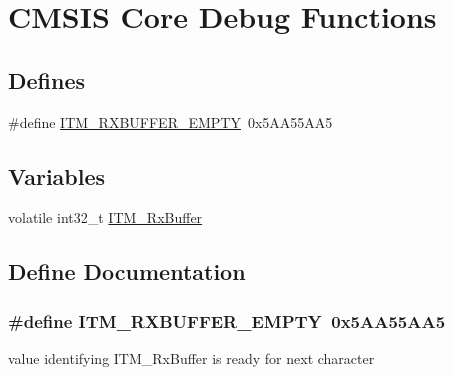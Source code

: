 \hypertarget{group___c_m_s_i_s__core___debug_functions}{\section{\-C\-M\-S\-I\-S \-Core \-Debug \-Functions}
\label{group___c_m_s_i_s__core___debug_functions}
}
\subsection*{\-Defines}
\begin{DoxyCompactItemize}
\item 
\#define \hyperlink{group___c_m_s_i_s__core___debug_functions_gaa822cb398ee022b59e9e6c5d7bbb228a}{\-I\-T\-M\-\_\-\-R\-X\-B\-U\-F\-F\-E\-R\-\_\-\-E\-M\-P\-T\-Y}~0x5\-A\-A55\-A\-A5
\end{DoxyCompactItemize}
\subsection*{\-Variables}
\begin{DoxyCompactItemize}
\item 
volatile int32\-\_\-t \hyperlink{group___c_m_s_i_s__core___debug_functions_ga12e68e55a7badc271b948d6c7230b2a8}{\-I\-T\-M\-\_\-\-Rx\-Buffer}
\end{DoxyCompactItemize}


\subsection{\-Define \-Documentation}
\hypertarget{group___c_m_s_i_s__core___debug_functions_gaa822cb398ee022b59e9e6c5d7bbb228a}{
\subsubsection[{\-I\-T\-M\-\_\-\-R\-X\-B\-U\-F\-F\-E\-R\-\_\-\-E\-M\-P\-T\-Y}]{\setlength{\rightskip}{0pt plus 5cm}\#define {\bf \-I\-T\-M\-\_\-\-R\-X\-B\-U\-F\-F\-E\-R\-\_\-\-E\-M\-P\-T\-Y}~0x5\-A\-A55\-A\-A5}}\label{group___c_m_s_i_s__core___debug_functions_gaa822cb398ee022b59e9e6c5d7bbb228a}
value identifying \-I\-T\-M\-\_\-\-Rx\-Buffer is ready for next character 

